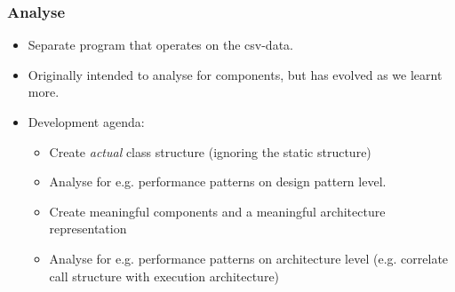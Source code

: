 \documentclass[10pt]{beamer}
\begin{document}
\begin{frame}[t]

\end{frame}

\begin{frame}[t]
\frametitle{Analyse}
\begin{itemize}
\item Separate program that operates on the csv-data.
\item Originally intended to analyse for components, but has evolved as we learnt more.
\item Development agenda:
\begin{itemize}
\item Create \emph{actual} class structure (ignoring the static structure)
\item Analyse for e.g. performance patterns on design pattern level.
\item Create meaningful components and a meaningful architecture representation
\item Analyse for e.g. performance patterns on architecture level (e.g. correlate call structure with execution architecture)
\end{itemize}
\end{itemize}
\end{frame}
\end{document}
